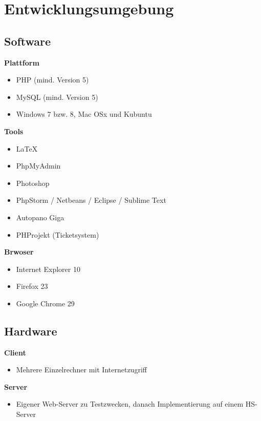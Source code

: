 \section{Entwicklungsumgebung}
\label{sec:Entwicklungsumgebung}

\subsection{Software}
\label{sec:Software}

\textbf{Plattform}

\begin{itemize}
  \item PHP (mind. Version 5)
  \item MySQL (mind. Version 5)
  \item Windows 7 bzw. 8, Mac OSx und Kubuntu
\end{itemize}

\textbf{Tools}

\begin{itemize}
  \item \LaTeX
  \item PhpMyAdmin
  \item Photoshop
  \item PhpStorm / Netbeans / Eclipse / Sublime Text
  \item Autopano Giga
  \item PHProjekt (Ticketsystem)
\end{itemize}

\textbf{Brwoser}

\begin{itemize}
  \item Internet Explorer 10
  \item Firefox 23
  \item Google Chrome 29
\end{itemize}

\subsection{Hardware}
\label{sec:Hardware}

\textbf{Client}

\begin{itemize}
  \item Mehrere Einzelrechner mit Internetzugriff
\end{itemize}

\textbf{Server}

\begin{itemize}
  \item  Eigener Web-Server zu Testzwecken, danach Implementierung auf einem HS-Server
\end{itemize}
